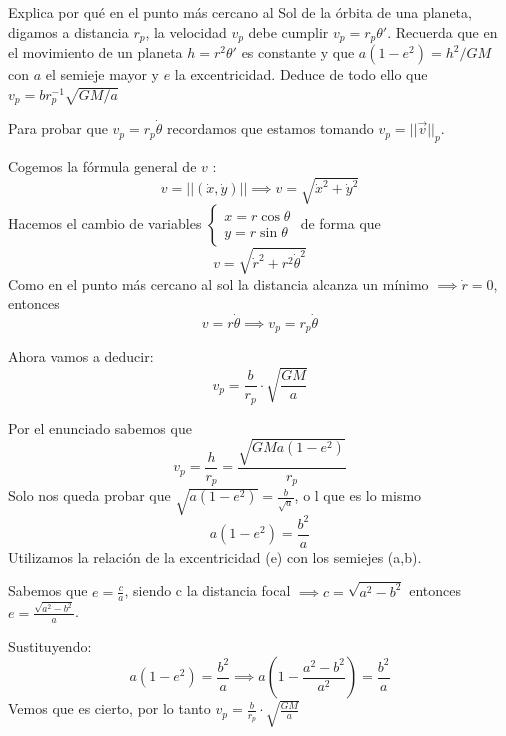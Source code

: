 \begin{problem}[5]
Explica por qué en el punto más cercano al Sol de la órbita de una planeta, digamos a distancia $r_p$, la velocidad $v_p$ debe cumplir $v_p=r_p\theta'$. Recuerda que en el movimiento de un planeta $h=r^2\theta'$ es constante y que $a(1-e^2)=h^2/GM$ con $a$ el semieje mayor y  $e$ la excentricidad. Deduce de todo ello que $v_p=br^{-1}_p\sqrt{GM/a}$

\solution
Para probar que $v_p=r_p\dot{\theta}$ recordamos que estamos tomando $v_p = ||\overrightarrow v||_p$.

Cogemos la fórmula general de $v$ : $$ v = ||(\dot{x}, \dot{y})|| \implies v= \sqrt{\dot{x}^2 + \dot{y}^2}$$
Hacemos el cambio de variables
$\begin{cases}
x = r\cos\theta\\
y = r\sin\theta
\end{cases}$ de forma que
$$v = \sqrt{\dot{r}^2 + r^2\dot{\theta}^2}$$
Como en el punto más cercano al sol la distancia alcanza un mínimo $\implies \dot r = 0$, entonces
$$v= r\dot{\theta} \implies v_p = r_p\dot{\theta}$$

Ahora vamos a deducir:
\[v_p = \frac{b}{r_p}\cdot \sqrt{\frac{GM}{a}}\]

Por el enunciado sabemos que
$$v_p = \frac{h}{r_p} = \frac{\sqrt{GMa(1-e^2)}}{r_p}$$
Solo nos queda probar que $\sqrt{a(1-e^2)}= \frac{b}{\sqrt{a}}$, o l que es lo mismo
$$a(1-e^2) = \frac{b^2}{a}$$
Utilizamos la relación de la excentricidad (e) con los semiejes (a,b).

Sabemos que $e = \frac{c}{a}$, siendo c la distancia focal $\implies c= \sqrt{a^2-b^2}$ entonces $e = \frac{\sqrt{a^2 - b^2}}{a}$.

Sustituyendo:
$$a(1-e^2) = \frac{b^2}{a} \implies a(1-\frac{a^2 - b^2}{a^2}) = \frac{b^2}{a}$$
Vemos que es cierto, por lo tanto $v_p = \frac{b}{r_p}\cdot \sqrt{\frac{GM}{a}}$
\end{problem}

